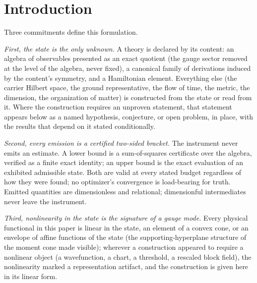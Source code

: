 \documentclass[11pt]{article}
\theoremstyle{definition}
\theoremstyle{remark}
\begin{document}
\begin{abstract}
A fully worked instance, SU(2) gauge theory on two plaquettes,
supplies certified spectra, closed-form geometry, and coupling towers,
and passes the framework's first decisive test: its Weyl consistency
requirement, certified spectral volume against the Hausdorff volume of
the state's metric, closes exactly, both sides in closed form.
Electrodynamic matter, with gravitation carried as a spin-2 boson
sector, is developed as declared content of the same framework; its
reads recover spectroscopy, order, frame, response, and the measured
gravitational quantities, and an executed relational control in
hydrogen exercises the emission pipeline end to end on a case where
both numbers are independently known.
\end{abstract}

\section{Introduction}\label{sec:intro}

Three commitments define this formulation.

\emph{First, the state is the only unknown.}  A theory is declared by its
content: an algebra of observables presented as an exact quotient (the
gauge sector removed at the level of the algebra, never fixed), a
canonical family of derivations induced by the content's symmetry, and a
Hamiltonian element.  Everything else (the carrier Hilbert space, the
ground representative, the flow of time, the metric, the dimension, the
organization of matter) is constructed from the state or read from it.
Where the construction requires an unproven statement, that statement
appears below as a named hypothesis, conjecture, or open problem, in
place, with the results that depend on it stated conditionally.

\emph{Second, every emission is a certified two-sided bracket.}  The
instrument never emits an estimate.  A lower bound is a sum-of-squares
certificate over the algebra, verified as a finite exact identity; an
upper bound is the exact evaluation of an exhibited admissible state.
Both are valid at every stated budget regardless of how they were found;
no optimizer's convergence is load-bearing for truth.  Emitted quantities
are dimensionless and relational; dimensionful intermediates never leave
the instrument.

\emph{Third, nonlinearity in the state is the signature of a gauge
mode.}  Every physical functional in this paper is linear in the state,
an element of a convex cone, or an envelope of affine functions of the
state (the supporting-hyperplane structure of the moment cone made
visible); wherever a construction appeared to require a nonlinear object
(a wavefunction, a chart, a threshold, a rescaled block field), the
nonlinearity marked a representation artifact, and the construction is
given here in its linear form.
\end{document}
